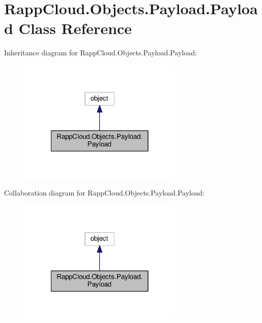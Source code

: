 \hypertarget{classRappCloud_1_1Objects_1_1Payload_1_1Payload}{\section{Rapp\-Cloud.\-Objects.\-Payload.\-Payload Class Reference}
\label{classRappCloud_1_1Objects_1_1Payload_1_1Payload}
}


Inheritance diagram for Rapp\-Cloud.\-Objects.\-Payload.\-Payload\-:
\nopagebreak
\begin{figure}[H]
\begin{center}
\leavevmode
\includegraphics[width=222pt]{classRappCloud_1_1Objects_1_1Payload_1_1Payload__inherit__graph}
\end{center}
\end{figure}


Collaboration diagram for Rapp\-Cloud.\-Objects.\-Payload.\-Payload\-:
\nopagebreak
\begin{figure}[H]
\begin{center}
\leavevmode
\includegraphics[width=222pt]{classRappCloud_1_1Objects_1_1Payload_1_1Payload__coll__graph}
\end{center}
\end{figure}
